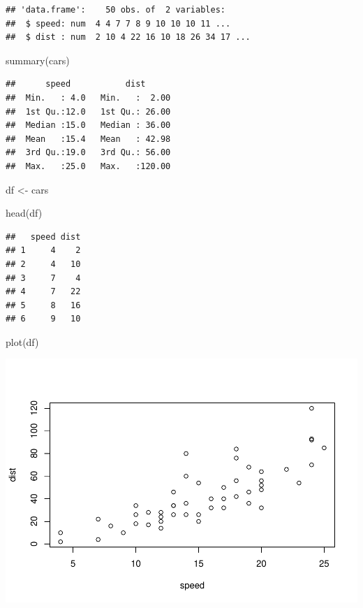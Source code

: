 \documentclass[
]{article}
\newenvironment{Shaded}{\begin{snugshade}}{\end{snugshade}}
\newcommand{\FunctionTok}[1]{\textcolor[rgb]{0.00,0.00,0.00}{#1}}
\newcommand{\NormalTok}[1]{#1}
\newcommand{\OtherTok}[1]{\textcolor[rgb]{0.56,0.35,0.01}{#1}}
\begin{document}
\begin{verbatim}
## 'data.frame':    50 obs. of  2 variables:
##  $ speed: num  4 4 7 7 8 9 10 10 10 11 ...
##  $ dist : num  2 10 4 22 16 10 18 26 34 17 ...
\end{verbatim}

\begin{Shaded}
\begin{Highlighting}[]
\FunctionTok{summary}\NormalTok{(cars)}
\end{Highlighting}
\end{Shaded}

\begin{verbatim}
##      speed           dist       
##  Min.   : 4.0   Min.   :  2.00  
##  1st Qu.:12.0   1st Qu.: 26.00  
##  Median :15.0   Median : 36.00  
##  Mean   :15.4   Mean   : 42.98  
##  3rd Qu.:19.0   3rd Qu.: 56.00  
##  Max.   :25.0   Max.   :120.00
\end{verbatim}

\begin{Shaded}
\begin{Highlighting}[]
\NormalTok{df }\OtherTok{\textless{}{-}}\NormalTok{ cars}
\end{Highlighting}
\end{Shaded}

\begin{Shaded}
\begin{Highlighting}[]
\FunctionTok{head}\NormalTok{(df)}
\end{Highlighting}
\end{Shaded}

\begin{verbatim}
##   speed dist
## 1     4    2
## 2     4   10
## 3     7    4
## 4     7   22
## 5     8   16
## 6     9   10
\end{verbatim}

\begin{Shaded}
\begin{Highlighting}[]
\FunctionTok{plot}\NormalTok{(df)}
\end{Highlighting}
\end{Shaded}

\includegraphics{intro2rj-short_files/figure-latex/unnamed-chunk-6-1.pdf}
\end{document}
